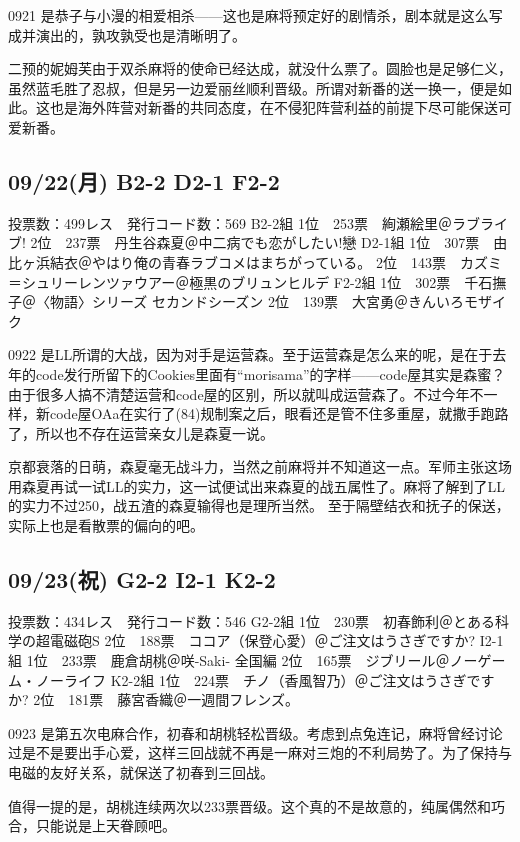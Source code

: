 0921 是恭子与小漫的相爱相杀——这也是麻将预定好的剧情杀，剧本就是这么写成并演出的，孰攻孰受也是清晰明了。

二预的妮姆芙由于双杀麻将的使命已经达成，就没什么票了。圆脸也是足够仁义，虽然蓝毛胜了忍叔，但是另一边爱丽丝顺利晋级。所谓对新番的送一换一，便是如此。这也是海外阵营对新番的共同态度，在不侵犯阵营利益的前提下尽可能保送可爱新番。

\subsection{09/22(月) B2-2 D2-1 F2-2}

	投票数：499レス　発行コード数：569
	B2-2組
	1位　253票　絢瀬絵里＠ラブライブ!
	2位　237票　丹生谷森夏＠中二病でも恋がしたい!戀
	D2-1組
	1位　307票　由比ヶ浜結衣＠やはり俺の青春ラブコメはまちがっている。
	2位　143票　カズミ＝シュリーレンツァウアー＠極黒のブリュンヒルデ
	F2-2組
	1位　302票　千石撫子＠〈物語〉シリーズ セカンドシーズン
	2位　139票　大宮勇＠きんいろモザイク

0922 是LL所谓的大战，因为对手是运营森。至于运营森是怎么来的呢，是在于去年的code发行所留下的Cookies里面有“morisama”的字样——code屋其实是森蜜？由于很多人搞不清楚运营和code屋的区别，所以就叫成运营森了。不过今年不一样，新code屋OAa在实行了(84)规制案之后，眼看还是管不住多重屋，就撒手跑路了，所以也不存在运营亲女儿是森夏一说。

京都衰落的日萌，森夏毫无战斗力，当然之前麻将并不知道这一点。军师主张这场用森夏再试一试LL的实力，这一试便试出来森夏的战五属性了。麻将了解到了LL的实力不过250，战五渣的森夏输得也是理所当然。
至于隔壁结衣和抚子的保送，实际上也是看散票的偏向的吧。

\subsection{09/23(祝) G2-2 I2-1 K2-2}

	投票数：434レス　発行コード数：546
	G2-2組
	1位　230票　初春飾利＠とある科学の超電磁砲S
	2位　188票　ココア（保登心愛）＠ご注文はうさぎですか?
	I2-1組
	1位　233票　鹿倉胡桃＠咲-Saki- 全国編
	2位　165票　ジブリール＠ノーゲーム・ノーライフ
	K2-2組
	1位　224票　チノ（香風智乃）＠ご注文はうさぎですか?
	2位　181票　藤宮香織＠一週間フレンズ。

0923 是第五次电麻合作，初春和胡桃轻松晋级。考虑到点兔连记，麻将曾经讨论过是不是要出手心爱，这样三回战就不再是一麻对三炮的不利局势了。为了保持与电磁的友好关系，就保送了初春到三回战。

值得一提的是，胡桃连续两次以233票晋级。这个真的不是故意的，纯属偶然和巧合，只能说是上天眷顾吧。

